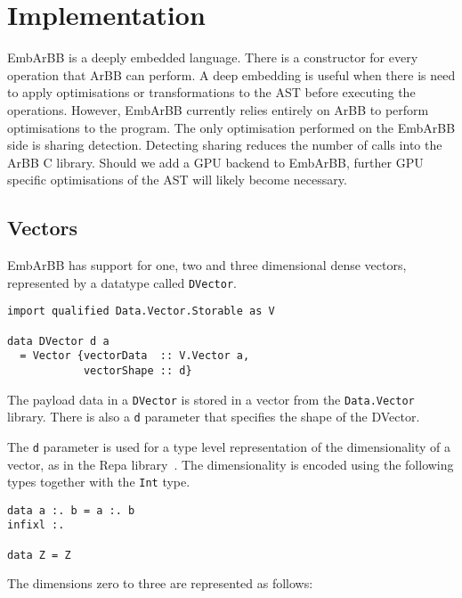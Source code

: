 

\section{Implementation} 
EmbArBB is a deeply embedded language. There is a constructor for 
every operation that ArBB can perform. A deep embedding is useful when 
there is need to apply optimisations or transformations to the AST before 
executing the operations. However, EmbArBB currently relies entirely on 
ArBB to perform optimisations to the program. The only optimisation 
performed on the EmbArBB side is sharing detection. Detecting sharing 
reduces the number of calls into the ArBB C library. Should we add a 
GPU backend to EmbArBB, further GPU specific optimisations of the AST 
will likely become necessary. 
 

\subsection{Vectors} 
EmbArBB has support for one, two and three dimensional dense vectors,
represented by a datatype called {\tt DVector}. 

\begin{verbatim}
import qualified Data.Vector.Storable as V

data DVector d a 
  = Vector {vectorData  :: V.Vector a, 
            vectorShape :: d} 
\end{verbatim}  

The payload data in a {\tt DVector} is stored in a vector from the 
{\tt Data.Vector} library. There is also a {\tt d} parameter that specifies 
the shape of the DVector. 


The {\tt d} parameter is used for a type level representation of the 
dimensionality of a vector, as in the Repa library~\cite{REPA}. The 
dimensionality is encoded using the following types together with 
the {\tt Int} type. 

\begin{verbatim} 
data a :. b = a :. b  
infixl :. 

data Z = Z 
\end{verbatim} 

The dimensions zero to three are represented as follows:

